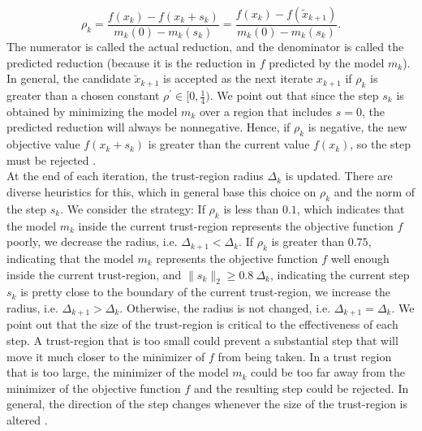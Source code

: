 \begin{equation}\label{agreement}
    \rho_k = \frac{f(x_k) - f(x_k + s_k)}{m_k(0) - m_k(s_k)} = \frac{f(x_k) - f(\widetilde{x}_{k+1})}{m_k(0) - m_k(s_k)}.
\end{equation}
The numerator is called the actual reduction, and the denominator is called the predicted reduction (because it is the reduction in $f$ predicted by the model $m_k$). \\
In general, the candidate $\widetilde{x}_{k+1}$ is accepted as the next iterate $x_{k+1}$ if $\rho_k$ is greater than a chosen constant $\rho^{\prime} \in [0 , \frac{1}{4})$. We point out that since the step $s_k$ is obtained by minimizing the model $m_k$ over a region that includes $s = 0$, the predicted reduction will always be nonnegative. Hence, if $\rho_k$ is negative, the new objective value $f(x_k + s_k)$ is greater than the current value $f(x_k)$, so the step must be rejected \cite[p.~68-69]{NocedalWright:2006}. \\
At the end of each iteration, the trust-region radius $\Delta_k$ is updated. There are diverse heuristics for this, which in general base this choice on $\rho_k$ and the norm of the step $s_k$. We consider the strategy: If $\rho_k$ is less than $0.1$, which indicates that the model $m_k$ inside the current trust-region represents the objective function $f$ poorly, we decrease the radius, i.e. $\Delta_{k+1} < \Delta_k$. If $\rho_k$ is greater than $0.75$, indicating that the model $m_k$ represents the objective function $f$ well enough inside the current trust-region, and $\lVert s_k \rVert_2 \geq 0.8 \ \Delta_k$, indicating the current step $s_k$ is pretty close to the boundary of the current trust-region, we increase the radius, i.e. $\Delta_{k+1} > \Delta_k$. Otherwise, the radius is not changed, i.e. $\Delta_{k+1} = \Delta_k$. We point out that the size of the trust-region is critical to the effectiveness of each step. A trust-region that is too small could prevent a substantial step that will move it much closer to the minimizer of $f$ from being taken. In a trust region that is too large, the minimizer of the model $m_k$ could be too far away from the minimizer of the objective function $f$ and the resulting step could be rejected. In general, the direction of the step changes whenever the size of the trust-region is altered \cite[p.~67]{NocedalWright:2006}. \\

